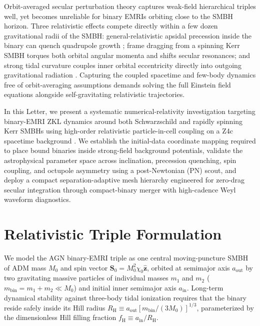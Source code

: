 \documentclass[aps,prl,twocolumn,10pt,superscriptaddress,nofootinbib,longbibliography,floatfix]{revtex4-2}
\newcommand{\Mzero}{M_0}
\newcommand{\chizero}{\chi_0}
\newcommand{\mbin}{m_{\mathrm{bin}}}
\newcommand{\ain}{a_{\mathrm{in}}}
\newcommand{\aout}{a_{\mathrm{out}}}
\newcommand{\RH}{R_{\mathrm{H}}}
\newcommand{\fH}{f_{\mathrm{H}}}
\begin{document}
Orbit-averaged secular perturbation theory captures weak-field hierarchical triples well, yet becomes unreliable for binary EMRIs orbiting close to the SMBH horizon. Three relativistic effects compete directly within a few dozen gravitational radii of the SMBH: general-relativistic apsidal precession inside the binary can quench quadrupole growth \cite{Blaes:2002,Liu:2015}; frame dragging from a spinning Kerr SMBH torques both orbital angular momenta and shifts secular resonances; and strong tidal curvature couples inner orbital eccentricity directly into outgoing gravitational radiation \cite{Cardoso:2026}. Capturing the coupled spacetime and few-body dynamics free of orbit-averaging assumptions demands solving the full Einstein field equations alongside self-gravitating relativistic trajectories.

In this Letter, we present a systematic numerical-relativity investigation targeting binary-EMRI ZKL dynamics around both Schwarzschild and rapidly spinning Kerr SMBHs using high-order relativistic particle-in-cell coupling on a Z4c spacetime background \cite{Bona:2003fj,Hilditch:2012fp,Zhu:2024utz,2026ApJS..283...27S,Wu:2026nrpic}. We establish the initial-data coordinate mapping required to place bound binaries inside strong-field background potentials, validate the astrophysical parameter space across inclination, precession quenching, spin coupling, and octupole asymmetry using a post-Newtonian (PN) scout, and deploy a compact separation-adaptive mesh hierarchy engineered for zero-drag secular integration through compact-binary merger with high-cadence Weyl waveform diagnostics.

\section{Relativistic Triple Formulation}
We model the AGN binary-EMRI triple as one central moving-puncture SMBH \cite{Campanelli:2005dd,Baker:2005vv,Bowen:1980yu} of ADM mass $\Mzero$ and spin vector $\bm{S}_0 = \Mzero^2 \chizero \hat{\bm{z}}$, orbited at semimajor axis $\aout$ by two gravitating massive particles of individual masses $m_1$ and $m_2$ ($\mbin = m_1 + m_2 \ll \Mzero$) and initial inner semimajor axis $\ain$. Long-term dynamical stability against three-body tidal ionization requires that the binary reside safely inside its Hill radius $\RH \equiv \aout [\mbin/(3\Mzero)]^{1/3}$, parameterized by the dimensionless Hill filling fraction $\fH \equiv \ain / \RH$.
\end{document}
